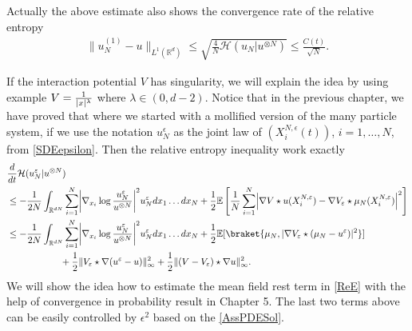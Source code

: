\begin{remark}
Actually the above estimate also shows the convergence rate of the relative entropy
\begin{align*}
\|u_N^{(1)}-u \|_{L^1(\mathbb{R}^d)}\leq \sqrt{ \frac{4}{N} \mathcal{H}(u_N | u^{\otimes N} )}\leq \frac{C(t)}{\sqrt{N}}.
\end{align*}
\end{remark}
\vskip1cm

If the interaction potential $V$ has singularity, we will explain the idea by using example $V=\frac{1}{\lvert x\rvert^{\lambda}}$ where $\lambda\in (0,d-2)$. Notice that in the previous chapter, we have proved that 
 where we started with a mollified version  of the many particle system, if we use the notation $u_{N}^\epsilon$ as the joint law of $(X^{N,\epsilon}_i(t))$, $i=1,\ldots,N$, from \autoref{SDEepsilon}. Then the relative entropy inequality work exactly 
 \begin{align}\label{ReEepsilon}
 &\frac{d}{dt} \mathcal{H}(u_{N}^\epsilon | u^{\otimes N}  ) \\
 \nonumber &\leq  -\frac{1}{2N} \int_{\mathbb{R}^{dN} } \sum_{i=1}^{N} \abs*{\nabla_{x_i} \log  \frac{u_N^\epsilon}{u^{\otimes N} }}^2 u_N^\epsilon  dx_{1}\ldots dx_N+ \frac{1}{2} \E\left[\frac{1}{N} \sum_{i=1}^{N} \abs*{\nabla V \star  u(X^{N,\epsilon}_i)-\nabla V_\epsilon \star  \mu_N(X^{N,\epsilon}_i)}^2 \right]\\
 \nonumber &\leq  -\frac{1}{2N} \int_{\mathbb{R}^{dN} } \sum_{i=1}^{N} \abs*{\nabla_{x_i} \log  \frac{u_N^\epsilon}{u^{\otimes N} }}^2 u_N^\epsilon  dx_{1}\ldots dx_N+ \frac{1}{2} \E[\braket{\mu_N , \abs{\nabla V_\varepsilon \star (\mu_N - u^\epsilon)}^2}]\\
 \nonumber &\hspace{2cm} + \frac{1}{2}\|V_\epsilon\star\nabla (u^\epsilon-u)\|^2_\infty+\frac{1}{2}\|(V-V_\epsilon)\star\nabla u\|^2_\infty
 .\end{align}
 We will show the idea how to estimate the mean field rest term in \autoref{ReE} with the help of convergence in probability result in Chapter 5. The last two terms above can be easily controlled by $\epsilon^2$ based on the \autoref{AssPDESol}.

